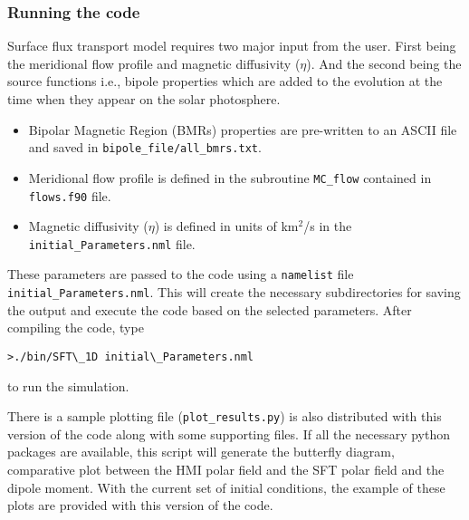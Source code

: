 \subsubsection{Running the code}
Surface flux transport model requires two major input from the user. First being the meridional flow profile and magnetic diffusivity ($\eta$). And the second being the source functions i.e., bipole properties which are added to the evolution at the time when they appear on the solar photosphere. 
\begin{itemize}
    \item Bipolar Magnetic Region (BMRs) properties are pre-written to an ASCII file and saved in \texttt{bipole\_file/all\_bmrs.txt}.
    \item Meridional flow profile is defined in the subroutine \texttt{MC\_flow} contained in \texttt{flows.f90} file. 
    \item Magnetic diffusivity ($\eta$) is defined in units of km$^2$/s in the \texttt{initial\_Parameters.nml} file.
\end{itemize}
These parameters are passed to the code using a \texttt{namelist} file \texttt{initial\_Parameters.nml}. This will create the necessary subdirectories for saving the output and execute the code based on the selected parameters. After compiling the code, type 
\begin{verbatim}
>./bin/SFT\_1D initial\_Parameters.nml
\end{verbatim}
to run the simulation.

There is a sample plotting file (\texttt{plot\_results.py}) is also distributed with this version of the code along with some supporting files. If all the necessary python packages are available, this script will generate the butterfly diagram, comparative plot between the HMI polar field and the SFT polar field and the dipole moment. With the current set of initial conditions, the example of these plots are provided with this version of the code. 
